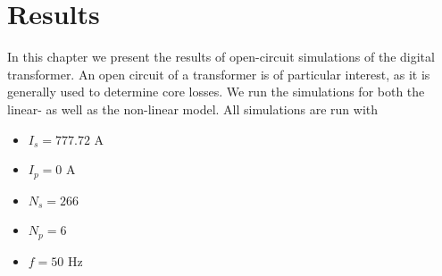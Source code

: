 \chapter{Results} \label{sec:results}
In this chapter we present the results of open-circuit simulations of the digital transformer.
An open circuit of a transformer is of particular interest, as it is generally used to determine core losses. 
We run the simulations for both the linear- as well as the non-linear model. 
All simulations are run with 
\begin{itemize}
    \item $I_s = 777.72$ A
    \item $I_p = 0$ A
    \item $N_s = 266$
    \item $N_p = 6$
    \item $f = 50$ Hz
\end{itemize}

